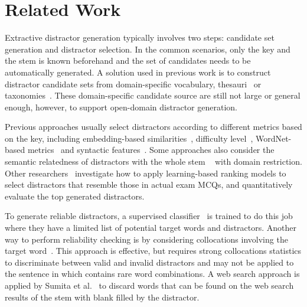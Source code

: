 \section{Related Work}
Extractive distractor generation typically involves two steps: 
candidate set generation and distractor selection.
In the common scenarios, only the key and the stem is known beforehand and the set of candidates needs to be automatically generated. A solution used in previous work is to construct distractor candidate sets from 
domain-specific vocabulary, thesauri~\cite{sumita2005measuring, smith2010gap} 
or taxonomies~\cite{hoshino2007assisting,mitkov2009semantic,ding2010automatic}. 
These domain-specific candidate source are still not large or general enough, however, to support open-domain distractor generation.

Previous approaches usually select distractors according to different metrics based on the key, including embedding-based similarities~\cite{guo2016questimator}, difficulty level~\cite{hoshino2007assisting,brown2005automatic,coniam2013preliminary,shei2001followyou}, WordNet-based metrics~\cite{mitkov2003computer} and 
syntactic features~\cite{agarwal2011automatic}.
Some approaches also consider the semantic relatedness of distractors with the whole stem ~\cite{pino2008selection,mostow2012generating} with domain restriction. Other researchers~\cite{liang2018distractor, sakaguchi2013discriminative, liang2017distractor} investigate how to apply learning-based ranking models to select distractors that resemble those in actual exam MCQs, and quantitatively evaluate the top generated distractors.

To generate reliable distractors, a supervised classifier~\cite{lee2007automatic} is trained to do this job where they have a limited list of potential target words and distractors. 
Another way to perform reliability checking is by considering collocations 
involving the target word~\cite{pino2008selection,smith2010gap,jiang2017distractor}. 
This approach is effective, but requires strong collocations statistics to 
discriminate between valid and invalid distractors and may not be applied to
the sentence in  which contains rare word combinations. 
A web search approach is applied by Sumita et al.~ to discard words that can be found on the web search results of the stem with blank filled by the distractor.
